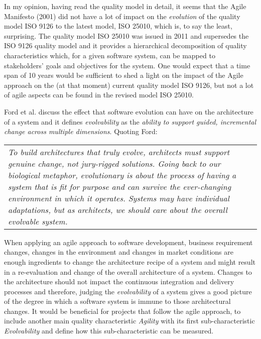 \documentclass[a4paper, 10pt, conference]{ieeeconf}
\begin{document}
\vspace{3 mm}

In my opinion, having read the quality model in detail, it seems that the Agile Manifesto (2001) did not have a lot of impact on the \textit{evolution} of the quality model ISO 9126 to the latest model, ISO 25010, which is, to say the least, surprising. The quality model ISO 25010 \cite{ISO25010} was issued in 2011 and supersedes the ISO 9126 quality model \cite{ISO9126} and it provides a hierarchical decomposition of quality characteristics which, for a given software system, can be mapped to stakeholders' goals and objectives for the system. One would expect that a time span of 10 years would be sufficient to shed a light on the impact of the Agile approach on the (at that moment) current quality model ISO 9126, but not a lot of agile aspects can be found in the revised model ISO 25010.

\vspace{3 mm}

Ford et al. \cite{Ford2017} discuss the effect that software evolution can have on the architecture of a system and it defines \textit{evolvability} as the \textit{ability to support guided, incremental change across multiple dimensions}. Quoting Ford:

\vspace{3 mm}

\begin{tabular}{|p{7.6cm}}
\textit{To build architectures that truly evolve, architects must support genuine change, not jury-rigged solutions. Going back to our biological metaphor, evolutionary is about the process of having a system that is fit for purpose and can survive the ever-changing environment in which it operates. Systems may have individual adaptations, but as architects, we should care about the overall evolvable system.}\\
\end{tabular}

\vspace{3 mm}

When applying an agile approach to software development, business requirement changes,  changes in the environment and changes in market conditions are enough ingredients to change the architecture recipe of a system and might result in a re-evaluation and change of the overall architecture of a system. Changes to the architecture should not impact the continuous integration and delivery processes and therefore, 
judging the \textit{evolvability} of a system gives a good picture of the degree in which a software system is immune to those architectural changes. It would be beneficial for projects that follow the agile approach, to include another main quality characteristic \textit{Agility} with its first sub-characteristic \textit{Evolvability} and define how this sub-characteristic can be measured.
\end{document}
